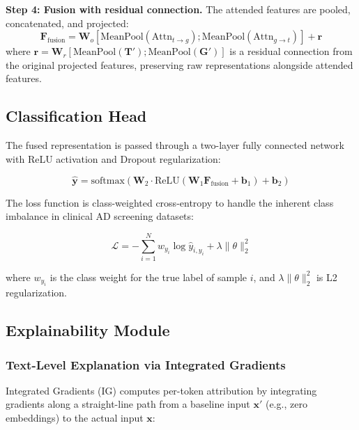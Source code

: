 \documentclass[11pt,onecolumn,a4paper]{article}
\begin{document}
\textbf{Step 4: Fusion with residual connection.} The attended features are pooled, concatenated, and projected:
\begin{equation}\label{eq:7}
    \mathbf{F}_{\text{fusion}} = \mathbf{W}_o \left[\text{MeanPool}(\text{Attn}_{t \rightarrow g}); \text{MeanPool}(\text{Attn}_{g \rightarrow t})\right] + \mathbf{r}
\end{equation}
where $\mathbf{r} = \mathbf{W}_r [\text{MeanPool}(\mathbf{T}'); \text{MeanPool}(\mathbf{G}')]$ is a residual connection from the original projected features, preserving raw representations alongside attended features.

\subsection{Classification Head}

The fused representation is passed through a two-layer fully connected network with ReLU activation and Dropout regularization:

\begin{equation}\label{eq:8}
    \hat{\mathbf{y}} = \text{softmax}\left(\mathbf{W}_2 \cdot \text{ReLU}(\mathbf{W}_1 \mathbf{F}_{\text{fusion}} + \mathbf{b}_1) + \mathbf{b}_2\right)
\end{equation}

The loss function is class-weighted cross-entropy to handle the inherent class imbalance in clinical AD screening datasets:

\begin{equation}\label{eq:9}
    \mathcal{L} = -\sum_{i=1}^{N} w_{y_i} \log \hat{y}_{i, y_i} + \lambda \|\theta\|_2^2
\end{equation}

where $w_{y_i}$ is the class weight for the true label of sample $i$, and $\lambda \|\theta\|_2^2$ is L2 regularization.

\subsection{Explainability Module}

\subsubsection{Text-Level Explanation via Integrated Gradients}

Integrated Gradients (IG) \cite{sundararajan2017} computes per-token attribution by integrating gradients along a straight-line path from a baseline input $\mathbf{x}'$ (e.g., zero embeddings) to the actual input $\mathbf{x}$:
\end{document}
